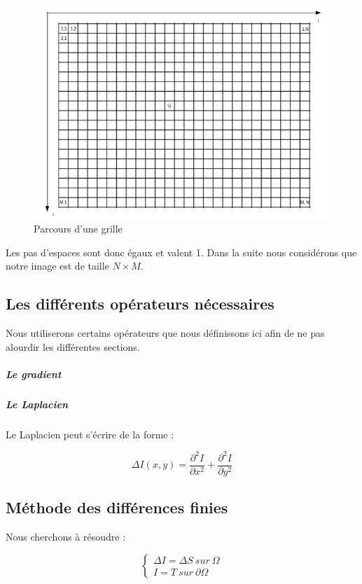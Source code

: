	\begin{figure}[!htb]
	\centering
	\includegraphics[scale=0.5]{Images/grille.png}
	\caption{Parcours d'une grille}
	\label{fig:my_label}
	\end{figure}
Les pas d'espaces sont donc égaux et valent 1. Dans la suite nous considérons que notre image est de taille $N \times M$.
\newpage


\subsection{Les différents opérateurs nécessaires}
Nous utiliserons certains opérateurs que nous définissons ici afin de ne pas alourdir les différentes sections. 
\subparagraph{Le gradient}

\subparagraph{Le Laplacien}
Le Laplacien peut s'écrire de la forme : 

\begin{center}
\begin{equation*}
    \Delta I(x,y)  = \frac{\partial^2 I}{\partial x^2}+ \frac{\partial ^2 I}{\partial y^2}
\end{equation*}
\end{center}

\subsection{Méthode des différences finies}
Nous cherchons à résoudre  : 
\begin{center}

\begin{equation*}
    \left \{
    \begin{aligned}
    \Delta I = \Delta S \ sur \ \Omega\\
    I = T \ sur \ \partial \Omega
    \end{aligned}
    \right.
\end{equation*}
\end{center}

